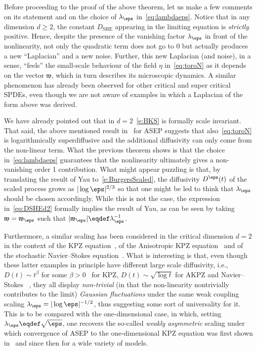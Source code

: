 \documentclass[reqno,11pt]{preprint}
\newcommand{\fw}{\mathfrak{w}}
\newcommand{\1}{\mathds{1}}
\newcommand{\SHE}{\mathrm{SHE}}
\begin{document}
Before proceeding to the proof of the above theorem, let us make a few comments on 
its statement and on the choice of $\lambda_\eps$ in~\eqref{eq:lambdaeps}. 
Notice that in any dimension $d\geq 2$, the constant $D_\SHE$ appearing in the limiting 
equation is {\it strictly} positive. Hence, despite the presence of the vanishing factor 
$\lambda_\eps$ in front of the nonlinearity, not only the quadratic term does not go to $0$ 
but actually produces a new ``Laplacian'' and a new noise. Further, this new Laplacian (and noise), in a sense,  
``feels'' the small-scale behaviour of the field $\eta$ in~\eqref{eq:toroN} 
as it depends on the vector $\fw$, which in turn describes 
its microscopic dynamics. A similar phenomenon has already been observed for other 
critical and super critical SPDEs, even though we are not aware of examples 
in which a Laplacian of the form above was derived. 

We have already pointed out that in $d=2$~\eqref{e:BKS} is formally scale invariant. 
That said, the above mentioned result in~\cite{Yau} 
for ASEP suggests that also~\eqref{eq:toroN} is logarithmically superdiffusive and the additional 
diffusivity can only come from the non-linear term. What the previous theorem 
shows is that the choice in~\eqref{eq:lambdaeps} guarantees that 
the nonlinearity ultimately gives a non-vanishing order 1 contribution. 
What might appear puzzling is that, by translating the result of Yau to~\eqref{e:BurgersScaled}, 
the diffusivity $D^\eps(t)$ of the scaled process grows as $|\log \eps|^{2/3}$ so that one might be led 
to think that $\lambda_\eps$ should be chosen accordingly. While this is not 
the case, the expression in~\eqref{eq:DSHEd2} formally implies the result of Yau, as can 
be seen by taking $\fw=\fw_\eps$ such that $|\fw_\eps|\eqdef \lambda_\eps^{-1}$. 

Furthermore, a similar scaling has been considered 
in the critical dimension $d=2$ in the context of the KPZ 
equation~\cite{CD,CSZ,Gu2020, caravennaCritical2dStochastic2023}, 
of the Anisotropic KPZ equation~\cite{CES,CETWeak} and of the stochastic Navier--Stokes equation~\cite{CK}. 
What is interesting is that, even though these latter examples in principle have 
different large scale diffusivity, i.e., $D(t)\sim t^\beta$ for some $\beta>0$~\cite{Forrest} for KPZ, 
$D(t)\sim \sqrt{\log t}$ for AKPZ 
and Navier--Stokes ~\cite{CET,Adler}, they all display {\it non-trivial} 
(in that the non-linearity nontrivially contributes to the limit) {\it Gaussian
fluctuations} under the same weak coupling scaling $\lambda_\eps=|\log\eps|^{-1/2}$, thus suggesting some sort of universality for it. 
This is to be compared with the one-dimensional case, in which, setting $\lambda_\eps\eqdef\sqrt\eps$, 
one recovers the so-called {\it weakly asymmetric} scaling under which convergence of 
ASEP to the one-dimensional KPZ equation was first shown in~\cite{BG} and since then for a wide 
variety of models. 
\end{document}
